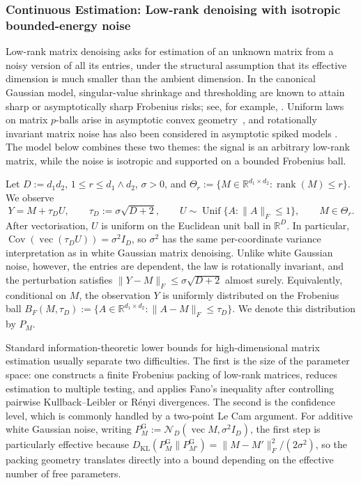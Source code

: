 \documentclass[11pt]{article}
\theoremstyle{definition}
\theoremstyle{remark}
\newcommand{\1}{\boldsymbol{1}}
\begin{document}
\subsubsection{Continuous Estimation: Low-rank denoising with isotropic bounded-energy noise}
\label{sec:boundedEnergyLowRank}

Low-rank matrix denoising asks for estimation of an unknown matrix from a noisy
version of all its entries, under the structural assumption that its effective
dimension is much smaller than the ambient dimension. In the canonical
Gaussian model, singular-value shrinkage and thresholding are known to attain
sharp or asymptotically sharp Frobenius risks; see, for example,
\cite{DonohoGavish2014}. Uniform laws on matrix $p$-balls arise in asymptotic
convex geometry~\cite{KaufmannThale2022}, and rotationally invariant matrix
noise has also been considered in asymptotic spiked models
\cite{DudejaLiuMa2026}. The model below combines these two themes: the signal
is an arbitrary low-rank matrix, while the noise is isotropic and supported
on a bounded Frobenius ball.

Let \(D:=d_1d_2\), \(1\leq r\leq d_1\wedge d_2\), \(\sigma>0\), and
\(\Theta_r:=\{M\in\mathbb R^{d_1\times d_2}:
\operatorname{rank}(M)\leq r\}\).
We observe
\begin{equation}
    Y=M+\tau_D U,
    \qquad
    \tau_D:=\sigma\sqrt{D+2},
    \qquad
    U\sim\operatorname{Unif}\{A:\|A\|_F\leq1\},
    \qquad
    M\in\Theta_r.
\label{eq:boundedEnergyLowRankModel}
\end{equation}
After vectorisation, $U$ is uniform on the Euclidean unit ball in
$\mathbb R^D$. In particular,
\(\operatorname{Cov}(\operatorname{vec}(\tau_DU))=\sigma^2I_D\),
so $\sigma^2$ has the same per-coordinate variance interpretation as in white
Gaussian matrix denoising. Unlike white Gaussian noise, however, the entries
are dependent, the law is rotationally invariant, and the perturbation
satisfies \(\|Y-M\|_F\leq\sigma\sqrt{D+2}\) almost surely.
Equivalently, conditional on $M$, the observation $Y$ is uniformly distributed
on the Frobenius ball
\(B_F(M,\tau_D):=\{A\in\mathbb R^{d_1\times d_2}:
\|A-M\|_F\leq\tau_D\}\).
We denote this distribution by $P_M$.

Standard information-theoretic lower bounds for high-dimensional matrix
estimation usually separate two difficulties. The first is the size of the
parameter space: one constructs a finite Frobenius packing of low-rank
matrices, reduces estimation to multiple testing, and applies Fano's
inequality after controlling pairwise Kullback--Leibler or R\'enyi
divergences. The second is the confidence level, which is commonly handled
by a two-point Le Cam argument. For additive white Gaussian noise, writing
\(P_M^{\mathrm G}:=
\mathcal N_D(\operatorname{vec}M,\sigma^2I_D)\),
the first step is particularly effective because
\(D_{\mathrm{KL}}(P_M^{\mathrm G}\|P_{M'}^{\mathrm G})
=\|M-M'\|_F^2/(2\sigma^2)\),
so the packing geometry translates directly into a bound depending on the
effective number of free parameters.
\end{document}
